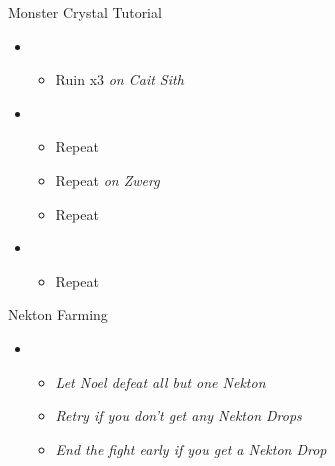 \begin{battle}{Monster Crystal Tutorial}
  \begin{itemize}
    \item \first
          \begin{itemize}
            \item Ruin x3 \textit{on Cait Sith}
          \end{itemize}
    \item \second
          \begin{itemize}
            \item Repeat
            \item Repeat \textit{on Zwerg}
            \item Repeat
          \end{itemize}
    \item \first
          \begin{itemize}
            \item Repeat
          \end{itemize}
  \end{itemize}
\end{battle}

\begin{battle}{Nekton Farming}
  \begin{itemize}
    \item \first
          \begin{itemize}
            \item \textit{Let Noel defeat all but one Nekton}
            \item \textit{Retry if you don't get any Nekton Drops}
            \item \textit{End the fight early if you get a Nekton Drop}
          \end{itemize}
  \end{itemize}
\end{battle}



